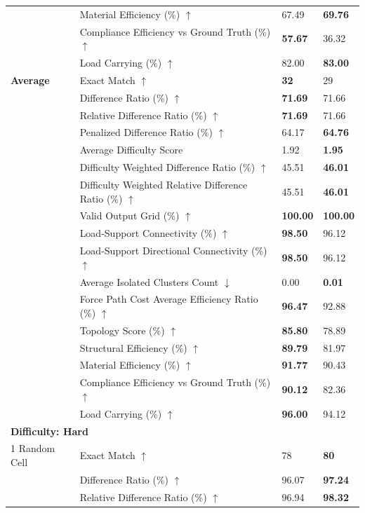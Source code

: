 \begin{table}[!h]
{\begin{tabular}{llll}
 & Material Efficiency (\%) $\uparrow$ & 67.49 & \textbf{69.76} \\
 & Compliance Efficiency vs Ground Truth (\%) $\uparrow$ & \textbf{57.67} & 36.32 \\
 & Load Carrying (\%) $\uparrow$ & 82.00 & \textbf{83.00} \\
\midrule
\textbf{Average} & Exact Match $\uparrow$ & \textbf{32} & 29 \\
 & Difference Ratio (\%) $\uparrow$ & \textbf{71.69} & 71.66 \\
 & Relative Difference Ratio (\%) $\uparrow$ & \textbf{71.69} & 71.66 \\
 & Penalized Difference Ratio (\%) $\uparrow$ & 64.17 & \textbf{64.76} \\
 & Average Difficulty Score & 1.92 & \textbf{1.95} \\
 & Difficulty Weighted Difference Ratio (\%) $\uparrow$ & 45.51 & \textbf{46.01} \\
 & Difficulty Weighted Relative Difference Ratio (\%) $\uparrow$ & 45.51 & \textbf{46.01} \\
 & Valid Output Grid (\%) $\uparrow$ & \textbf{100.00} & \textbf{100.00} \\
 & Load-Support Connectivity (\%) $\uparrow$ & \textbf{98.50} & 96.12 \\
 & Load-Support Directional Connectivity (\%) $\uparrow$ & \textbf{98.50} & 96.12 \\
 & Average Isolated Clusters Count $\downarrow$ & 0.00 & \textbf{0.01} \\
 & Force Path Cost Average Efficiency Ratio (\%) $\uparrow$ & \textbf{96.47} & 92.88 \\
 & Topology Score (\%) $\uparrow$ & \textbf{85.80} & 78.89 \\
 & Structural Efficiency (\%) $\uparrow$ & \textbf{89.79} & 81.97 \\
 & Material Efficiency (\%) $\uparrow$ & \textbf{91.77} & 90.43 \\
 & Compliance Efficiency vs Ground Truth (\%) $\uparrow$ & \textbf{90.12} & 82.36 \\
 & Load Carrying (\%) $\uparrow$ & \textbf{96.00} & 94.12 \\
\midrule
\multicolumn{4}{l}{\textbf{Difficulty: Hard}}\\
\midrule
1 Random Cell & Exact Match $\uparrow$ & 78 & \textbf{80} \\
 & Difference Ratio (\%) $\uparrow$ & 96.07 & \textbf{97.24} \\
 & Relative Difference Ratio (\%) $\uparrow$ & 96.94 & \textbf{98.32} \\

\end{tabular}}
\end{table}
